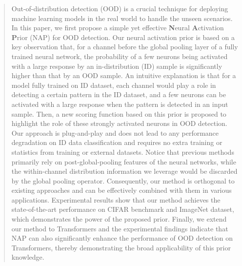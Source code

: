 \begin{abstract}
  Out-of-distribution detection (OOD) is a crucial technique for deploying machine learning models in the real world to handle the unseen scenarios. 
In this paper, we first propose a simple yet effective \textbf{N}eural \textbf{A}ctivation \textbf{P}rior (NAP) for OOD detection.
Our neural activation prior is based on a key observation that,  for a channel before the global pooling layer of a fully trained neural network, the probability of a few  neurons being activated with a large response by an in-distribution (ID) sample is significantly higher than that by an OOD sample. An intuitive explanation is that for a model fully trained on ID dataset, each channel   would play a role in detecting a certain pattern in  the ID dataset, and a few neurons can be activated with a large response when the pattern is detected in an input sample.
Then, a new scoring function based on this prior is proposed  to highlight the role of these strongly activated neurons in OOD detection.
Our approach is plug-and-play and does not lead to any performance degradation on ID data classification and requires no extra training or statistics from training or external datasets.
Notice that previous methods primarily rely on  post-global-pooling features of the neural networks, while the within-channel distribution information we leverage would be discarded by the global pooling operator. Consequently, our method is orthogonal to existing approaches and can be effectively combined with them in various applications. Experimental results show that our method achieves the state-of-the-art performance on CIFAR benchmark and ImageNet dataset, which demonstrates the power of the proposed prior. 
Finally, we extend our method to Transformers and the experimental findings indicate that NAP can also significantly enhance the performance of OOD detection on Transformers, thereby demonstrating the broad applicability of this prior knowledge.
\end{abstract}